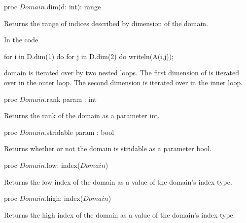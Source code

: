 \begin{protohead}
proc $Domain$.dim(d: int): range
\end{protohead}
\begin{protobody}
Returns the range of indices described by dimension  of the
domain.
\end{protobody}

\begin{example}
In the code
\begin{chapel}
for i in D.dim(1) do
  for j in D.dim(2) do
    writeln(A(i,j));
\end{chapel}
domain  is iterated over by two nested loops.  The first
dimension of  is iterated over in the outer loop.  The second
dimension is iterated over in the inner loop.
\end{example}


\begin{protohead}
proc $Domain$.rank param : int
\end{protohead}
\begin{protobody}
Returns the rank of the domain as a parameter int.
\end{protobody}

\begin{protohead}
proc $Domain$.stridable param : bool
\end{protohead}
\begin{protobody}
Returns whether or not the domain is stridable as a parameter bool.
\end{protobody}

\begin{protohead}
proc $Domain$.low: index($Domain$)
\end{protohead}
\begin{protobody}
Returns the low index of the domain as a value of the domain's index
type.
\end{protobody}

\begin{protohead}
proc $Domain$.high: index($Domain$)
\end{protohead}
\begin{protobody}
Returns the high index of the domain as a value of the domain's index
type.
\end{protobody}


